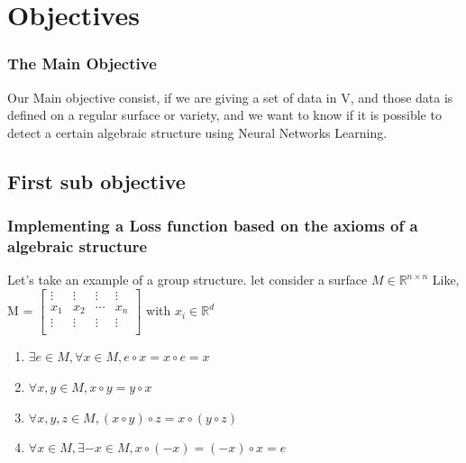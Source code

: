 \documentclass{beamer}
\begin{document}
\section{Objectives}
\begin{frame}
    \frametitle{The Main Objective}
    Our Main objective consist,  if we are giving a set of data in V, and those data is defined on a regular surface or variety, and we want to know if it is possible to detect a certain algebraic structure using Neural Networks Learning.
\end{frame}

\subsection{First sub objective} 
\begin{frame}
    \frametitle{Implementing a Loss function based on the axioms of a
    algebraic structure}
    Let's take an example of a group structure.
    let consider a surface $M \in \mathbb{R}^{n \times n}$
    Like, 
    M = 
    $\begin{bmatrix}
        \vdots & \vdots & \vdots &\vdots \\
        x_{1} & x_{2} & \cdots & x_{n} \\
        \vdots & \vdots & \vdots &\vdots \\
    \end{bmatrix}
    $
    with $ x_{i} \in \mathbb{R}^{d}$
    \begin{enumerate}
        \item $\exists e \in M, \forall x \in M, e \circ x = x \circ e = x$
        \item $\forall x,y \in M, x \circ y = y \circ x$
        \item $\forall x,y,z \in M, (x \circ y) \circ z = x \circ (y \circ z)$
        \item $\forall x \in M, \exists -x \in M, x \circ (-x) = (-x) \circ x=e$
    \end{enumerate}

    
\end{frame}



\end{document}
